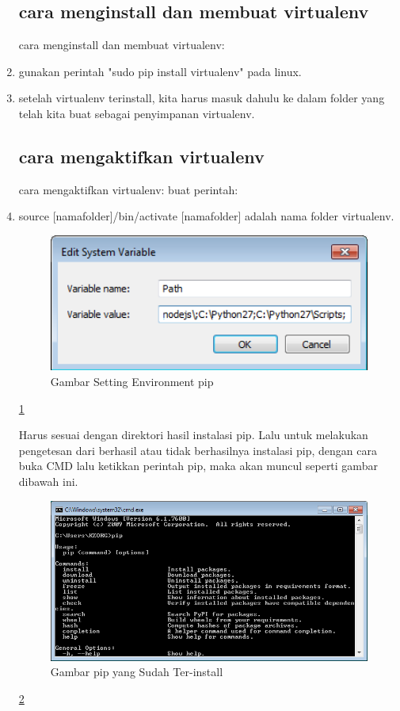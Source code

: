 \begin{enumerate}
	\subsection {cara menginstall dan membuat virtualenv}
	cara menginstall dan membuat virtualenv:
			\item gunakan perintah "sudo pip install virtualenv" pada linux.
			\item setelah virtualenv terinstall, kita harus masuk dahulu ke dalam folder yang telah kita buat sebagai penyimpanan virtualenv.
			
	\subsection{cara mengaktifkan virtualenv}
	cara mengaktifkan virtualenv:
	buat perintah:
			\item source [namafolder]/bin/activate
				[namafolder] adalah nama folder virtualenv.
				  
	\begin{figure} [ht]
		\centerline{\includegraphics[width=1\textwidth]{figures/setting-env.png}}
		\caption{Gambar Setting Environment pip}
		\label{setting-env}
	\end{figure}
	
	\ref{setting-env}
	
	Harus sesuai dengan direktori hasil instalasi pip. Lalu untuk melakukan pengetesan dari berhasil atau tidak berhasilnya instalasi pip, dengan cara buka CMD lalu ketikkan perintah pip, maka akan muncul seperti gambar dibawah ini.
	
	\begin{figure} [ht]
		\centerline{\includegraphics[width=1\textwidth]{figures/pip-terinstall.png}}
		\caption{Gambar pip yang Sudah Ter-install}
		\label{pip-terinstall}
	\end{figure}
	
	\ref{pip-terinstall}
				  
		\end{enumerate}

